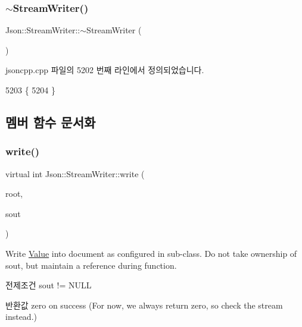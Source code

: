\subsubsection{\texorpdfstring{$\sim$\+Stream\+Writer()}{~StreamWriter()}}
{\footnotesize\ttfamily Json\+::\+Stream\+Writer\+::$\sim$\+Stream\+Writer (\begin{DoxyParamCaption}{ }\end{DoxyParamCaption})\hspace{0.3cm}{\ttfamily [virtual]}}



jsoncpp.\+cpp 파일의 5202 번째 라인에서 정의되었습니다.


\begin{DoxyCode}
5203 \{
5204 \}
\end{DoxyCode}


\subsection{멤버 함수 문서화}
\mbox{\label{class_json_1_1_stream_writer_a84278bad0c9a9fc587bc2a97c5bb5993}} 
\subsubsection{\texorpdfstring{write()}{write()}}
{\footnotesize\ttfamily virtual int Json\+::\+Stream\+Writer\+::write (\begin{DoxyParamCaption}\item[{\hyperlink{class_json_1_1_value}{Value} const \&}]{root,  }\item[{\hyperlink{json_8h_a37a25be5fca174927780caeb280094ce}{J\+S\+O\+N\+C\+P\+P\+\_\+\+O\+S\+T\+R\+E\+AM} $\ast$}]{sout }\end{DoxyParamCaption})\hspace{0.3cm}{\ttfamily [pure virtual]}}

Write \hyperlink{class_json_1_1_value}{Value} into document as configured in sub-\/class. Do not take ownership of sout, but maintain a reference during function. \begin{DoxyPrecond}{전제조건}
sout != N\+U\+LL 
\end{DoxyPrecond}
\begin{DoxyReturn}{반환값}
zero on success (For now, we always return zero, so check the stream instead.) 
\end{DoxyReturn}

